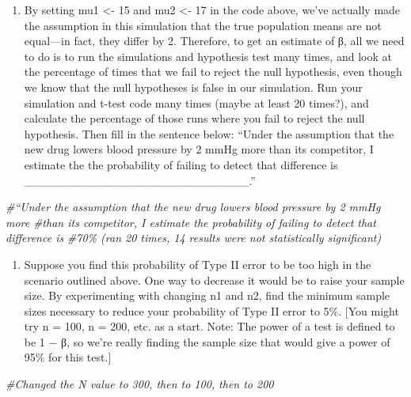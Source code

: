 \documentclass[
]{article}
\newenvironment{Shaded}{\begin{snugshade}}{\end{snugshade}}
\newcommand{\CommentTok}[1]{\textcolor[rgb]{0.56,0.35,0.01}{\textit{#1}}}
\providecommand{\tightlist}{%
  \setlength{\itemsep}{0pt}\setlength{\parskip}{0pt}}
\begin{document}
\begin{enumerate}
\def\labelenumi{\alph{enumi}.}
\tightlist
\item
  By setting mu1 \textless- 15 and mu2 \textless- 17 in the code above,
  we've actually made the assumption in this simulation that the true
  population means are not equal---in fact, they differ by 2. Therefore,
  to get an estimate of β, all we need to do is to run the simulations
  and hypothesis test many times, and look at the percentage of times
  that we fail to reject the null hypothesis, even though we know that
  the null hypotheses is false in our simulation. Run your simulation
  and t-test code many times (maybe at least 20 times?), and calculate
  the percentage of those runs where you fail to reject the null
  hypothesis. Then fill in the sentence below: ``Under the assumption
  that the new drug lowers blood pressure by 2 mmHg more than its
  competitor, I estimate the the probability of failing to detect that
  difference is
  \_\_\_\_\_\_\_\_\_\_\_\_\_\_\_\_\_\_\_\_\_\_\_\_\_\_\_.''
\end{enumerate}

\begin{Shaded}
\begin{Highlighting}[]
\CommentTok{\#“Under the assumption that the new drug lowers blood pressure by 2 mmHg more}
\CommentTok{\#than its competitor, I estimate the probability of failing to detect that difference is}
\CommentTok{\#70\% (ran 20 times, 14 results were not statistically significant)}
\end{Highlighting}
\end{Shaded}

\begin{enumerate}
\def\labelenumi{\alph{enumi}.}
\setcounter{enumi}{1}
\tightlist
\item
  Suppose you find this probability of Type II error to be too high in
  the scenario outlined above. One way to decrease it would be to raise
  your sample size. By experimenting with changing n1 and n2, find the
  minimum sample sizes necessary to reduce your probability of Type II
  error to 5\%. {[}You might try n = 100, n = 200, etc. as a start.
  Note: The power of a test is defined to be 1 − β, so we're really
  finding the sample size that would give a power of 95\% for this
  test.{]}
\end{enumerate}

\begin{Shaded}
\begin{Highlighting}[]
\CommentTok{\#Changed the N value to 300, then to 100, then to 200}
\end{Highlighting}
\end{Shaded}
\end{document}
